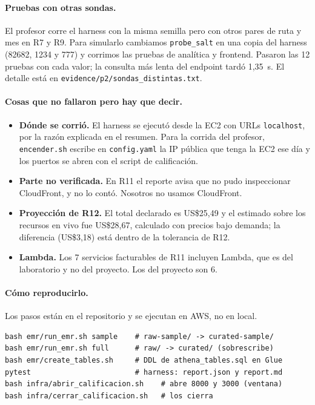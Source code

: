 \documentclass[11pt,letterpaper]{article}
\begin{document}
\paragraph{Pruebas con otras sondas.} El profesor corre el harness con la misma semilla pero con otros pares de ruta y mes en R7 y R9. Para simularlo cambiamos \texttt{probe\_salt} en una copia del harness (82682, 1234 y 777) y corrimos las pruebas de analítica y frontend. Pasaron las 12 pruebas con cada valor; la consulta más lenta del endpoint tardó 1,35~s. El detalle está en \texttt{evidence/p2/sondas\_distintas.txt}.

\paragraph{Cosas que no fallaron pero hay que decir.}
\begin{itemize}
  \item \textbf{Dónde se corrió.} El harness se ejecutó desde la EC2 con URLs \texttt{localhost}, por la razón explicada en el resumen. Para la corrida del profesor, \texttt{encender.sh} escribe en \texttt{config.yaml} la IP pública que tenga la EC2 ese día y los puertos se abren con el script de calificación.
  \item \textbf{Parte no verificada.} En R11 el reporte avisa que no pudo inspeccionar CloudFront, y no lo contó. Nosotros no usamos CloudFront.
  \item \textbf{Proyección de R12.} El total declarado es US\$25,49 y el estimado sobre los recursos en vivo fue US\$28,67, calculado con precios bajo demanda; la diferencia (US\$3,18) está dentro de la tolerancia de R12.
  \item \textbf{Lambda.} Los 7 servicios facturables de R11 incluyen Lambda, que es del laboratorio y no del proyecto. Los del proyecto son 6.
\end{itemize}

\paragraph{Cómo reproducirlo.} Los pasos están en el repositorio y se ejecutan en AWS, no en local.
\begin{lstlisting}
bash emr/run_emr.sh sample    # raw-sample/ -> curated-sample/
bash emr/run_emr.sh full      # raw/ -> curated/ (sobrescribe)
bash emr/create_tables.sh     # DDL de athena_tables.sql en Glue
pytest                        # harness: report.json y report.md
bash infra/abrir_calificacion.sh    # abre 8000 y 3000 (ventana)
bash infra/cerrar_calificacion.sh   # los cierra
\end{lstlisting}
\end{document}
